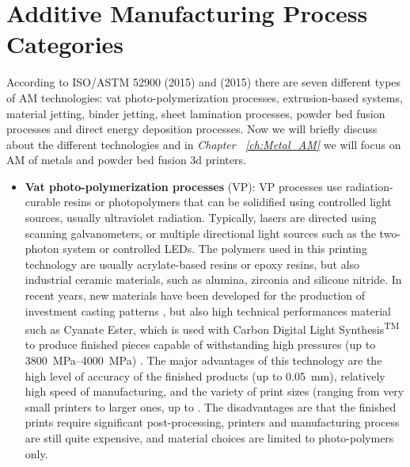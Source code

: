 \section{Additive Manufacturing Process Categories} 
\label{sec:AMproc}
According to ISO/ASTM 52900 \cite{organization_isoastm_2015} (2015) and \citeauthor{gibson_additive_2015} (2015) there are seven different types of AM technologies: vat photo-polymerization processes, extrusion-based systems, material jetting, binder jetting, sheet lamination processes, powder bed fusion processes and direct energy deposition processes. Now we will briefly discuss about the different technologies and in \emph{Chapter~ \ref{ch:Metal_AM}} we will focus on AM of metals and powder bed fusion 3d printers.
\begin{itemize}
    \item \textbf{Vat photo-polymerization processes} (VP): VP processes use radiation-curable resins or photopolymers that can be solidified using controlled light sources, usually ultraviolet radiation. Typically, lasers are directed using scanning galvanometers, or multiple directional light sources such as the two-photon system or controlled LEDs. The polymers used in this printing technology are usually acrylate-based resins or epoxy resins, but also industrial ceramic materials, such as alumina, zirconia and silicone nitride. In recent years, new materials have been developed for the production of investment casting patterns \cite{3d_systems_investment_2023}, but also high technical performances material such as Cyanate Ester, which is used with Carbon Digital Light Synthesis\textsuperscript{TM} to produce finished pieces capable of withstanding high pressures (up to \SIrange[range-phrase = --]{3800}{4000}{\mega\pascal}) \cite{carbon_3d_carbon_2023}. The major advantages of this technology are the high level of accuracy of the finished products (up to \SI{0.05}{\milli\metre}), relatively high speed of manufacturing, and the variety of print sizes (ranging from very small printers to larger ones, up to . The disadvantages are that the finished prints require significant post-processing, printers and manufacturing process are still quite expensive, and material choices are limited to photo-polymers only.

\end{itemize}
